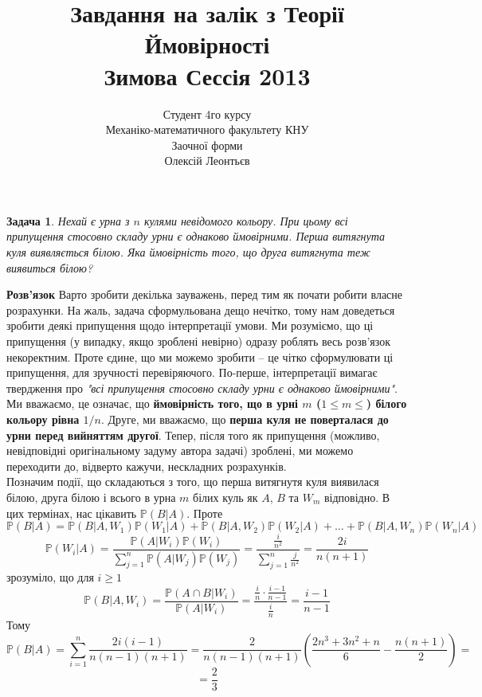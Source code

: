 \documentclass[8pt]{article} %
\title{Завдання на залік з Теорії Ймовірності\\Зимова Сессія 2013}
\author{Студент 4го курсу\\Механіко-математичного факультету КНУ\\Заочної форми\\Олексій Леонтьєв}
\newtheorem{problem}{Задача}
\newenvironment{solution}%
{\par\textbf{Розв'язок}\space }%
{\par}
\renewcommand{\P}{\mathbb{P}}
\begin{document}
\maketitle
\begin{problem}
Нехай є урна з $n$ кулями невідомого кольору. При цьому всі припущення стосовно складу урни є однаково ймовірними. Перша витягнута куля виявляється
білою. Яка ймовірність того, що друга витягнута теж виявиться білою?
\end{problem}
\begin{solution}
Варто зробити декілька зауважень, перед тим як почати робити власне розрахунки. На жаль, задача сформульована дещо нечітко, тому нам доведеться
зробити деякі припущення щодо інтерпретації умови. Ми розуміємо, що ці припущення (у випадку, якщо зроблені невірно) одразу роблять весь
розв'язок некоректним. Проте єдине, що ми можемо зробити -- це чітко сформулювати ці припущення, для зручності перевіряючого. По-перше, 
інтерпретації вимагає твердження про \textit{"всі припущення стосовно складу урни є однаково ймовірними"}. Ми вважаємо, це означає, що
\textbf{ймовірність того, що в урні $m$ ($1\leq m\leq$) білого кольору рівна $1/n$}. Друге, ми вважаємо, що \textbf{перша куля не поверталася
до урни перед вийняттям другої}. Тепер, після того як припущення (можливо, невідповідні оригінальному задуму автора задачі) зроблені, ми можемо
переходити до, відверто кажучи, нескладних розрахунків.\\
Позначим події, що складаються з того, що перша витягнутя куля виявилася білою, друга білою і всього в урна $m$ білих куль як $A$, $B$ та
$W_m$ відповідно. В цих термінах, нас цікавить $\mathbb{P}(B|A)$. Проте
\[\P(B|A)=\P(B|A,W_1)\P(W_1|A)+\P(B|A,W_2)\P(W_2|A)+\ldots+\P(B|A,W_n)\P(W_n|A)\]
\[\P(W_i|A)=\frac{\P(A|W_i)\P(W_i)}{\sum_{j=1}^n\P(A|W_j)\P(W_j)}=\frac{\frac{i}{n^2}}{\sum_{j=1}^n \frac{j}{n^2}}=\frac{2i}{n(n+1)}\]
зрозуміло, що для $i\geq1$
\[\P(B|A,W_i)=\frac{\P(A\cap B|W_i)}{\P(A|W_i)}=\frac{\frac{i}{n}\cdot\frac{i-1}{n-1}}{\frac{i}{n}}=\frac{i-1}{n-1}\]
Тому
\[\P(B|A)=\sum_{i=1}^n \frac{2i(i-1)}{n(n-1)(n+1)}=\frac{2}{n(n-1)(n+1)}\left(\frac{2n^3+3n^2+n}{6}-\frac{n(n+1)}{2}\right)=\]
\[=\frac{2}{3}\]
\end{solution}
\end{document}

